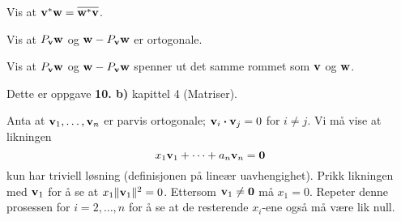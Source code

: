 \begin{oppgave}
Vis at $\mathbf{v}^* \mathbf{w}=\overline{\mathbf{w}^* \mathbf{v}}$.
\end{oppgave}

\begin{oppgave}
Vis at $P_{\mathbf{v}}\mathbf{w}$ og $\mathbf{w}-P_{\mathbf{v}}\mathbf{w}$ er ortogonale.
\end{oppgave}


\begin{losning}
\end{losning}


\begin{oppgave}
Vis at $P_{\mathbf{v}}\mathbf{w}$ og $\mathbf{w}-P_{\mathbf{v}}\mathbf{w}$ spenner ut det samme rommet som $\mathbf{v}$ og $\mathbf{w}$.
\end{oppgave}




\begin{losning}
\begin{punkt}
Dette er oppgave \textbf{10. b)} kapittel 4 (Matriser).
\end{punkt}
\begin{punkt}
Anta at $\mathbf{v}_1,\dots,\mathbf{v}_n$ er parvis ortogonale; $\mathbf{v}_i\boldsymbol{\cdot}\mathbf{v}_j=0$ for $i\neq j$. Vi må vise at likningen $$x_1\mathbf{v}_1+\dots+a_n\mathbf{v}_n=\mathbf{0}$$ kun har triviell løsning (definisjonen på lineær uavhengighet). Prikk likningen med $\mathbf{v}_1$ for å se at $x_1\|\mathbf{v}_1\|^2=0$. Ettersom $\mathbf{v}_1\neq \mathbf{0}$ må $x_1=0$. Repeter denne prosessen for $i=2,\dots,n$ for å se at de resterende $x_i$-ene også må være lik null.
\end{punkt}
\end{losning}

